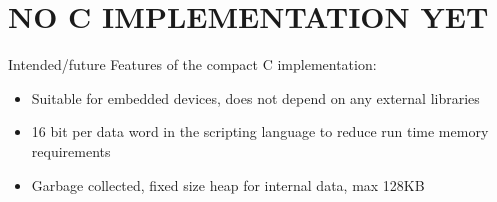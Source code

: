 \section{NO C IMPLEMENTATION YET}
Intended/future Features of the compact C implementation:
\begin{itemize}
\item Suitable for embedded devices, does not depend on any external libraries
\item 16 bit per data word in the scripting language to reduce run time memory requirements
\item Garbage collected, fixed size heap for internal data, max 128KB
\end{itemize}
